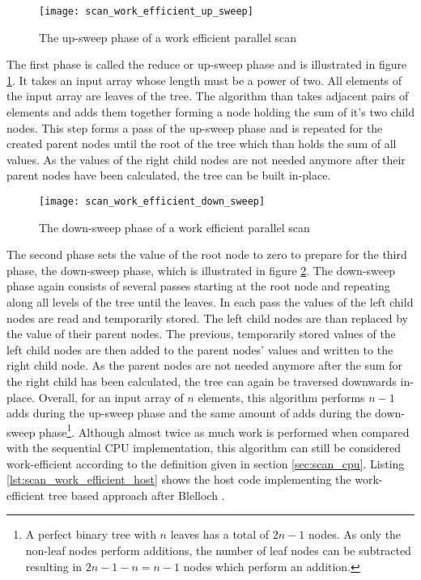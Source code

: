 \begin{figure}[h]
\centering
\texttt{[image: scan\_work\_efficient\_up\_sweep]}
\caption{The up-sweep phase of a work efficient parallel scan \cite{gpu_gems_3_chapter_39}}
\label{fig:scan_work_efficient_up_sweep}
\end{figure}

The first phase is called the reduce or up-sweep phase and is illustrated in figure \ref{fig:scan_work_efficient_up_sweep}. It takes an input array whose length must be a power of two. All elements of the input array are leaves of the tree. The algorithm than takes adjacent pairs of elements and adds them together forming a node holding the sum of it's two child nodes. This step forms a pass of the up-sweep phase and is repeated for the created parent nodes until the root of the tree which than holds the sum of all values. As the values of the right child nodes are not needed anymore after their parent nodes have been calculated, the tree can be built in-place.

\begin{figure}[h]
\centering
\texttt{[image: scan\_work\_efficient\_down\_sweep]}
\caption{The down-sweep phase of a work efficient parallel scan \cite{gpu_gems_3_chapter_39}}
\label{fig:scan_work_efficient_down_sweep}
\end{figure}

The second phase sets the value of the root node to zero to prepare for the third phase, the down-sweep phase, which is illustrated in figure \ref{fig:scan_work_efficient_down_sweep}. The down-sweep phase again consists of several passes starting at the root node and repeating along all levels of the tree until the leaves. In each pass the values of the left child nodes are read and temporarily stored. The left child nodes are than replaced by the value of their parent nodes. The previous, temporarily stored values of the left child nodes are then added to the parent nodes' values and written to the right child node. As the parent nodes are not needed anymore after the sum for the right child has been calculated, the tree can again be traversed downwards in-place.
Overall, for an input array of $n$ elements, this algorithm performs $n - 1$ adds during the up-sweep phase and the same amount of adds during the down-sweep phase\footnote{A perfect binary tree with $n$ leaves has a total of $2n - 1$ nodes. As only the non-leaf nodes perform additions, the number of leaf nodes can be subtracted resulting in $2n - 1 - n = n - 1$ nodes which perform an addition.}. Although almost twice as much work is performed when compared with the sequential CPU implementation, this algorithm can still be considered work-efficient according to the definition given in section \ref{sec:scan_cpu}.
Listing \ref{lst:scan_work_efficient_host} shows the host code implementing the work-efficient tree based approach after Blelloch \cite{scan_blelloch}.

